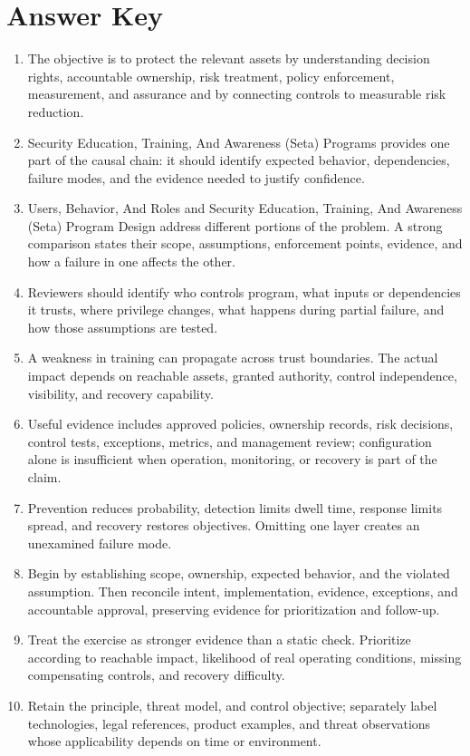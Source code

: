 \documentclass[11pt]{article}
\begin{document}
\section*{Answer Key}
\begin{enumerate}
\item The objective is to protect the relevant assets by understanding decision rights, accountable ownership, risk treatment, policy enforcement, measurement, and assurance and by connecting controls to measurable risk reduction.
\item Security Education, Training, And Awareness (Seta) Programs provides one part of the causal chain: it should identify expected behavior, dependencies, failure modes, and the evidence needed to justify confidence.
\item Users, Behavior, And Roles and Security Education, Training, And Awareness (Seta) Program Design address different portions of the problem. A strong comparison states their scope, assumptions, enforcement points, evidence, and how a failure in one affects the other.
\item Reviewers should identify who controls program, what inputs or dependencies it trusts, where privilege changes, what happens during partial failure, and how those assumptions are tested.
\item A weakness in training can propagate across trust boundaries. The actual impact depends on reachable assets, granted authority, control independence, visibility, and recovery capability.
\item Useful evidence includes approved policies, ownership records, risk decisions, control tests, exceptions, metrics, and management review; configuration alone is insufficient when operation, monitoring, or recovery is part of the claim.
\item Prevention reduces probability, detection limits dwell time, response limits spread, and recovery restores objectives. Omitting one layer creates an unexamined failure mode.
\item Begin by establishing scope, ownership, expected behavior, and the violated assumption. Then reconcile intent, implementation, evidence, exceptions, and accountable approval, preserving evidence for prioritization and follow-up.
\item Treat the exercise as stronger evidence than a static check. Prioritize according to reachable impact, likelihood of real operating conditions, missing compensating controls, and recovery difficulty.
\item Retain the principle, threat model, and control objective; separately label technologies, legal references, product examples, and threat observations whose applicability depends on time or environment.
\end{enumerate}
\end{document}
